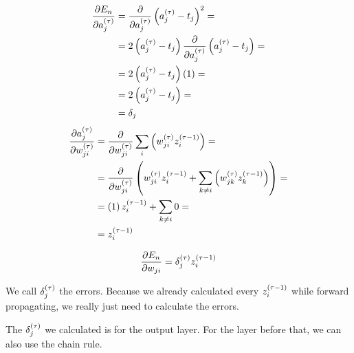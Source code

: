 \documentclass[a4paper,12pt]{article}
\theoremstyle{mytheoremstyle}
\theoremstyle{mytheoremstyle}
\theoremstyle{myproblemstyle}
\begin{document}
    \begin{equation}
        \begin{split}
            \frac{\partial {E_{n}}}{\partial {a_{j}^{\left( \tau \right)}}} & = \frac{\partial {}}{\partial {a_{j}^{\left( \tau \right)}}} \left( a_{j}^{\left( \tau \right)} - t_{j} \right)^{2} = \\
            & = 2 \left( a_{j}^{\left( \tau \right)} - t_{j} \right) \frac{\partial {}}{\partial {a_{j}^{\left( \tau \right)}}} \left( a_{j}^{\left( \tau \right)} - t_{j} \right) = \\
            & = 2 \left( a_{j}^{\left( \tau \right)} - t_{j} \right) \left( 1 \right) = \\
            & = 2 \left( a_{j}^{\left( \tau \right)} - t_{j} \right) = \\
            & = \delta_{j}
        \end{split}
    \end{equation}
    \begin{equation}
        \begin{split}
            \frac{\partial {a_{j}^{\left( \tau \right)}}}{\partial {w_{ji}^{\left( \tau \right)}}} & = \frac{\partial {}}{\partial {w_{ji}^{\left( \tau \right)}}} \displaystyle\sum_{i} \left( w_{ji}^{\left( \tau \right)} z_{i}^{\left( \tau - {1} \right)} \right) = \\
            & = \frac{\partial {}}{\partial {w_{ji}^{\left( \tau \right)}}} \left( w_{ji}^{\left( \tau \right)} z_{i}^{\left( \tau - {1} \right)} + \displaystyle\sum_{k \neq i} \left( w_{jk}^{\left( \tau \right)} z_{k}^{\left( \tau - {1} \right)} \right) \right) = \\
            & = \left( 1 \right) z_{i}^{\left( \tau - {1} \right)} + \displaystyle\sum_{k \neq i} 0 = \\
            & = z_{i}^{\left( \tau - {1} \right)}
        \end{split}
    \end{equation}

    \begin{equation}
        \frac{\partial {E_{n}}}{\partial {w_{ji}}} = \delta_{j}^{\left( \tau \right)} z_{i}^{\left( \tau - {1} \right)}
    \end{equation}

    We call $ \delta_{j}^{\left( \tau \right)} $ the errors. Because we already calculated
    every $ z_{i}^{\left( \tau - {1} \right)} $ while forward propagating, we really just
    need to calculate the errors.

    The $ \delta_{j}^{\left( \tau \right)} $ we calculated is for the output layer. For the
    layer before that, we can also use the chain rule.
\end{document}
